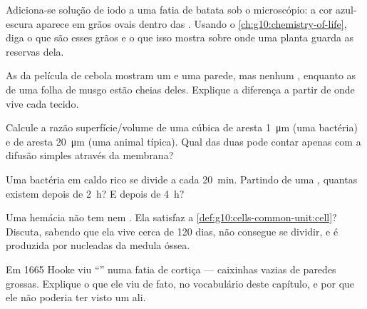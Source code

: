 \begin{exercise}[$\star\star$]\label{exo:g10:cells-common-unit:8}
Adiciona-se solução de iodo a uma fatia de batata sob o microscópio: a
cor azul-escura aparece em grãos ovais dentro das . Usando o
\cref{ch:g10:chemistry-of-life}, diga o que são esses grãos e o que
isso mostra sobre onde uma planta guarda as reservas dela.
\end{exercise}

\begin{exercise}[$\star\star$]\label{exo:g10:cells-common-unit:9}
As  da película de cebola mostram um  e uma parede, mas
nenhum , enquanto as  de uma folha de musgo estão
cheias deles. Explique a diferença a partir de onde vive cada tecido.
\end{exercise}

\begin{exercise}[$\star\star$]\label{exo:g10:cells-common-unit:10}
Calcule a razão superfície/volume de uma  cúbica de aresta
\qty{1}{\micro m} (uma bactéria) e de aresta \qty{20}{\micro m} (uma
 animal típica). Qual das duas pode contar apenas com a difusão
simples através da membrana?
\end{exercise}

\begin{exercise}[$\star\star$]\label{exo:g10:cells-common-unit:11}
Uma bactéria em caldo rico se divide a cada \qty{20}{min}. Partindo de
uma , quantas existem depois de \qty{2}{h}? E depois de \qty{4}{h}?
\end{exercise}

\begin{exercise}[$\star\star\star$]\label{exo:g10:cells-common-unit:12}
Uma hemácia não tem  nem . Ela satisfaz a
\cref{def:g10:cells-common-unit:cell}? Discuta, sabendo que ela vive
cerca de 120 dias, não consegue se dividir, e é produzida por 
nucleadas da medula óssea.
\end{exercise}

\begin{exercise}[$\star\star\star$]\label{exo:g10:cells-common-unit:13}
Em 1665 Hooke viu ``'' numa fatia de cortiça --- caixinhas
vazias de paredes grossas. Explique o que ele viu de fato, no
vocabulário deste capítulo, e por que ele não poderia ter visto um
 ali.
\end{exercise}

